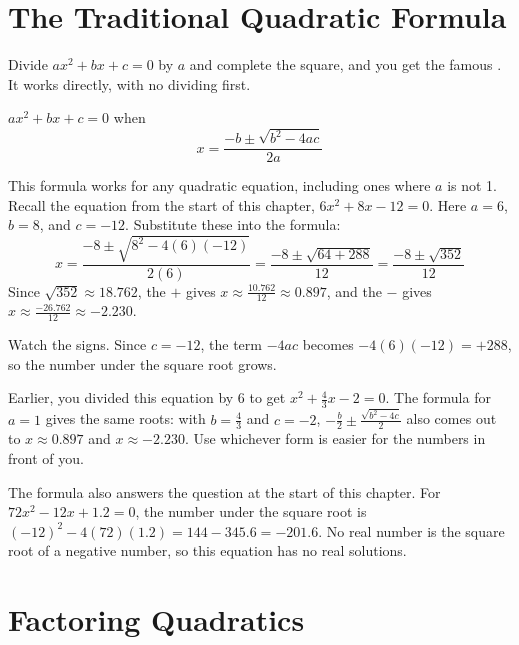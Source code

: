 \section{The Traditional Quadratic Formula}

Divide $ax^2 + bx + c = 0$ by $a$ and complete the square, and you get the
famous . It works
directly, with no dividing first.

\begin{mdframed}[style=important, frametitle={The Quadratic Formula}]

$ax^2 + bx + c = 0$ when
\begin{equation*}
  x = \frac{-b \pm \sqrt{b^2 - 4ac}}{2a}
\end{equation*}

\end{mdframed}

This formula works for any quadratic equation, including ones where $a$ is
not 1. Recall the equation from the start of this chapter,
$6x^2 + 8x - 12 = 0$. Here $a = 6$, $b = 8$, and $c = -12$. Substitute these
into the formula:
\begin{equation*}
  x = \frac{-8 \pm \sqrt{8^2 - 4(6)(-12)}}{2(6)}
    = \frac{-8 \pm \sqrt{64 + 288}}{12}
    = \frac{-8 \pm \sqrt{352}}{12}
\end{equation*}
Since $\sqrt{352} \approx 18.762$, the $+$ gives
$x \approx \frac{10.762}{12} \approx 0.897$, and the $-$ gives
$x \approx \frac{-26.762}{12} \approx -2.230$.

Watch the signs. Since $c = -12$, the term $-4ac$ becomes
$-4(6)(-12) = +288$, so the number under the square root grows.

Earlier, you divided this equation by 6 to get $x^2 + \frac{4}{3}x - 2 = 0$.
The formula for $a = 1$ gives the same roots: with $b = \frac{4}{3}$ and
$c = -2$, $-\frac{b}{2} \pm \frac{\sqrt{b^2 - 4c}}{2}$ also comes out to
$x \approx 0.897$ and $x \approx -2.230$. Use whichever form is easier for
the numbers in front of you.

The formula also answers the question at the start of this chapter. For
$72x^2 - 12x + 1.2 = 0$, the number under the square root is
$(-12)^2 - 4(72)(1.2) = 144 - 345.6 = -201.6$. No real number is the square
root of a negative number, so this equation has no real solutions.


\section{Factoring Quadratics}

